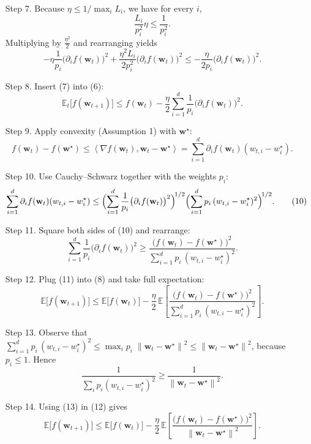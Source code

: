 \documentclass{article}
\newcommand{\E}{\mathbb{E}}
\newcommand{\norm}[1]{\left\lVert #1 \right\rVert}
\newcommand{\ip}[2]{\left\langle #1,#2 \right\rangle}
\begin{document}
\begin{enumerate}
\item[Step 7.]  Because $\eta\le 1/\max_i L_i$, we have for every $i$,
\[
\frac{L_i}{p_i^{2}}\eta\le \frac{1}{p_i^{2}}.
\]
Multiplying by $\frac{\eta^{2}}{2}$ and rearranging yields
\[
-\eta\frac{1}{p_i}\bigl(\partial_i f(\mathbf w_t)\bigr)^{2}
+\frac{\eta^{2}L_i}{2p_i^{2}}\bigl(\partial_i f(\mathbf w_t)\bigr)^{2}
\le -\frac{\eta}{2p_i}\bigl(\partial_i f(\mathbf w_t)\bigr)^{2}.
\tag{7}
\]

\item[Step 8.]  Insert (7) into (6):
\[
\E_t\!\bigl[f(\mathbf w_{t+1})\bigr]
\le f(\mathbf w_t)-\frac{\eta}{2}\sum_{i=1}^{d}\frac{1}{p_i}\bigl(\partial_i f(\mathbf w_t)\bigr)^{2}.
\tag{8}
\]

\item[Step 9.]  Apply convexity (Assumption 1) with $\mathbf w^\star$:
\[
f(\mathbf w_t)-f(\mathbf w^\star)\le \ip{\nabla f(\mathbf w_t)}{\mathbf w_t-\mathbf w^\star}
= \sum_{i=1}^{d}\partial_i f(\mathbf w_t)(w_{t,i}-w_i^\star).
\tag{9}
\]

\item[Step 10.]  Use Cauchy–Schwarz together with the weights $p_i$:
\[
\sum_{i=1}^{d}\partial_i f(\mathbf w_t)(w_{t,i}-w_i^\star)
\le \Bigl(\sum_{i=1}^{d}\frac{1}{p_i}\bigl(\partial_i f(\mathbf w_t)\bigr)^{2}\Bigr)^{\!1/2}
      \Bigl(\sum_{i=1}^{d}p_i\,(w_{t,i}-w_i^\star)^{2}\Bigr)^{\!1/2}.
\tag{10}
\]

\item[Step 11.]  Square both sides of (10) and rearrange:
\[
\sum_{i=1}^{d}\frac{1}{p_i}\bigl(\partial_i f(\mathbf w_t)\bigr)^{2}
\ge
\frac{\bigl(f(\mathbf w_t)-f(\mathbf w^\star)\bigr)^{2}}
      {\sum_{i=1}^{d}p_i\,(w_{t,i}-w_i^\star)^{2}}.
\tag{11}
\]

\item[Step 12.]  Plug (11) into (8) and take full expectation:
\[
\E\!\bigl[f(\mathbf w_{t+1})\bigr]
\le \E\!\bigl[f(\mathbf w_t)\bigr]
-\frac{\eta}{2}\,
\E\!\left[
\frac{\bigl(f(\mathbf w_t)-f(\mathbf w^\star)\bigr)^{2}}
      {\sum_{i=1}^{d}p_i\,(w_{t,i}-w_i^\star)^{2}}
\right].
\tag{12}
\]

\item[Step 13.]  Observe that $\sum_{i=1}^{d}p_i\,(w_{t,i}-w_i^\star)^{2}\le
\max_{i}p_i\;\norm{\mathbf w_t-\mathbf w^\star}^{2}\le \norm{\mathbf w_t-\mathbf w^\star}^{2}$,
because $p_i\le1$. Hence
\[
\frac{1}{\sum_{i}p_i (w_{t,i}-w_i^\star)^{2}}
\ge \frac{1}{\norm{\mathbf w_t-\mathbf w^\star}^{2}}.
\tag{13}
\]

\item[Step 14.]  Using (13) in (12) gives
\[
\E\!\bigl[f(\mathbf w_{t+1})\bigr]
\le \E\!\bigl[f(\mathbf w_t)\bigr]
-\frac{\eta}{2}\,
\E\!\left[
\frac{\bigl(f(\mathbf w_t)-f(\mathbf w^\star)\bigr)^{2}}
      {\norm{\mathbf w_t-\mathbf w^\star}^{2}}
\right].
\tag{14}
\]


\end{enumerate}
\end{document}
